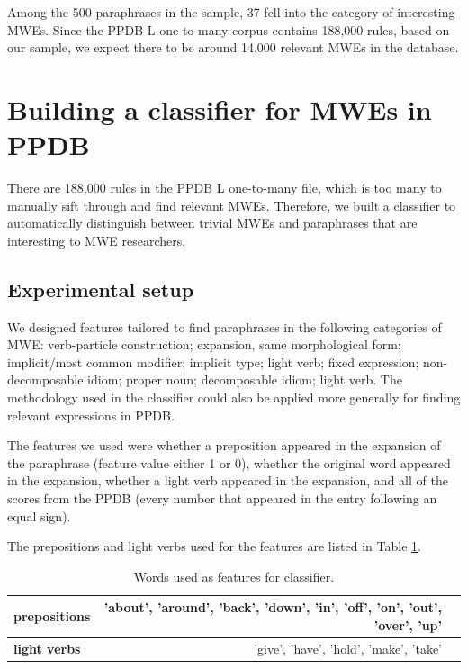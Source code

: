 \documentclass[11pt]{article}
\begin{document}
Among the 500 paraphrases in the sample, 37 fell into the category of interesting MWEs. Since the PPDB L one-to-many corpus contains 188,000 rules, based on our sample, we expect there to be around 14,000 relevant MWEs in the database.

\section{Building a classifier for MWEs in PPDB}

There are 188,000 rules in the PPDB L one-to-many file, which is too many to manually sift through and find relevant MWEs. Therefore, we built a classifier to automatically distinguish between trivial MWEs and paraphrases that are interesting to MWE researchers.

\subsection{Experimental setup}

We designed features tailored to find paraphrases in the following categories of MWE: verb-particle construction; expansion, same morphological form; implicit/most common modifier; implicit type; light verb; fixed expression; non-decomposable idiom; proper noun; decomposable idiom; light verb. The methodology used in the classifier could also be applied more generally for finding relevant expressions in PPDB.

The features we used were whether a preposition appeared in the expansion of the paraphrase (feature value either 1 or 0), whether the original word appeared in the expansion, whether a light verb appeared in the expansion, and all of the scores from the PPDB (every number that appeared in the entry following an equal sign).

The prepositions and light verbs used for the features are listed in Table \ref{features}.

\begin{center}
\begin{table}
{\small
\hfill{}
\begin{tabular}{|l|rl|}
\hline \bf prepositions &  'about', 'around', 'back', 'down', 'in', 'off', 'on', 'out', 'over', 'up'  &\\ \hline
\bf light verbs &  'give', 'have', 'hold', 'make', 'take' &\\
\hline
\end{tabular}}
\hfill{}
\caption{\label{features} Words used as features for classifier. }
\end{table}
\end{center}
\end{document}
